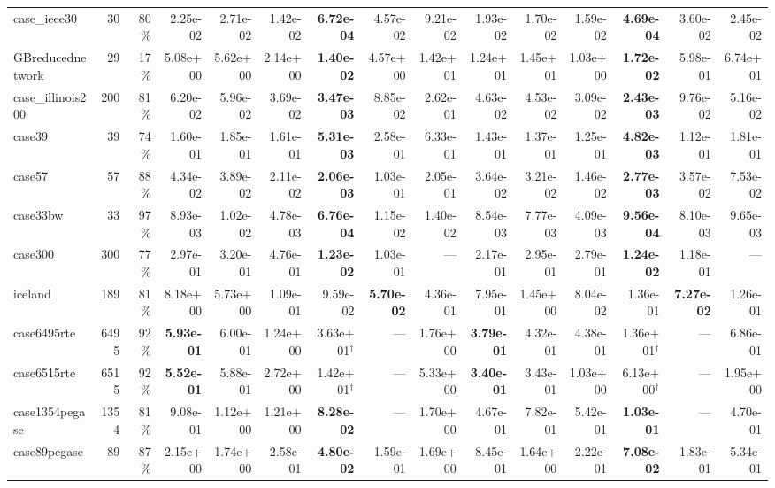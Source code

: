 \documentclass[10pt]{article}
\begin{document}
\begin{landscape}
\begin{table}[H]
\begin{tabular}{lrr rrrrrr rrrrrr}
case\_ieee30 & 30 & 80\% & 2.25e-02 & 2.71e-02 & 1.42e-02 & \textbf{6.72e-04} & 4.57e-02 & 9.21e-02 & 1.93e-02 & 1.70e-02 & 1.59e-02 & \textbf{4.69e-04} & 3.60e-02 & 2.45e-02 \\
GBreducednetwork & 29 & 17\% & 5.08e+00 & 5.62e+00 & 2.14e+00 & \textbf{1.40e-02} & 4.57e+00 & 1.42e+01 & 1.24e+01 & 1.45e+01 & 1.03e+00 & \textbf{1.72e-02} & 5.98e-01 & 6.74e+01 \\
case\_illinois200 & 200 & 81\% & 6.20e-02 & 5.96e-02 & 3.69e-02 & \textbf{3.47e-03} & 8.85e-02 & 2.62e-01 & 4.63e-02 & 4.53e-02 & 3.09e-02 & \textbf{2.43e-03} & 9.76e-02 & 5.16e-02 \\
case39 & 39 & 74\% & 1.60e-01 & 1.85e-01 & 1.61e-01 & \textbf{5.31e-03} & 2.58e-01 & 6.33e-01 & 1.43e-01 & 1.37e-01 & 1.25e-01 & \textbf{4.82e-03} & 1.12e-01 & 1.81e-01 \\
case57 & 57 & 88\% & 4.34e-02 & 3.89e-02 & 2.11e-02 & \textbf{2.06e-03} & 1.03e-01 & 2.05e-01 & 3.64e-02 & 3.21e-02 & 1.46e-02 & \textbf{2.77e-03} & 3.57e-02 & 7.53e-02 \\
case33bw & 33 & 97\% & 8.93e-03 & 1.02e-02 & 4.78e-03 & \textbf{6.76e-04} & 1.15e-02 & 1.40e-02 & 8.54e-03 & 7.77e-03 & 4.09e-03 & \textbf{9.56e-04} & 8.10e-03 & 9.65e-03 \\
case300 & 300 & 77\% & 2.97e-01 & 3.20e-01 & 4.76e-01 & \textbf{1.23e-02} & 1.03e-01 & --- & 2.17e-01 & 2.95e-01 & 2.79e-01 & \textbf{1.24e-02} & 1.18e-01 & --- \\
iceland & 189 & 81\% & 8.18e+00 & 5.73e+00 & 1.09e-01 & 9.59e-02 & \textbf{5.70e-02} & 4.36e-01 & 7.95e-01 & 1.45e+00 & 8.04e-02 & 1.36e-01 & \textbf{7.27e-02} & 1.26e-01 \\
case6495rte & 6495 & 92\% & \textbf{5.93e-01} & 6.00e-01 & 1.24e+00 & 3.63e+01$^\dagger$ & --- & 1.76e+00 & \textbf{3.79e-01} & 4.32e-01 & 4.38e-01 & 1.36e+01$^\dagger$ & --- & 6.86e-01 \\
case6515rte & 6515 & 92\% & \textbf{5.52e-01} & 5.88e-01 & 2.72e+00 & 1.42e+01$^\dagger$ & --- & 5.33e+00 & \textbf{3.40e-01} & 3.43e-01 & 1.03e+00 & 6.13e+00$^\dagger$ & --- & 1.95e+00 \\
case1354pegase & 1354 & 81\% & 9.08e-01 & 1.12e+00 & 1.21e+00 & \textbf{8.28e-02} & --- & 1.70e+00 & 4.67e-01 & 7.82e-01 & 5.42e-01 & \textbf{1.03e-01} & --- & 4.70e-01 \\
case89pegase & 89 & 87\% & 2.15e+00 & 1.74e+00 & 2.58e-01 & \textbf{4.80e-02} & 1.59e-01 & 1.69e+00 & 8.45e-01 & 1.64e+00 & 2.22e-01 & \textbf{7.08e-02} & 1.83e-01 & 5.34e-01 \\

\end{tabular}
\end{table}
\end{landscape}
\end{document}
